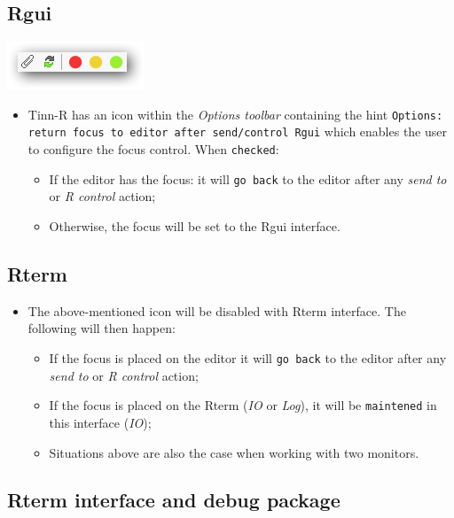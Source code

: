 \subsection{Rgui}

\includegraphics[scale=0.50]{./res/focus.png}

\begin{itemize}
  \item Tinn-R has an icon within the \textit{Options toolbar}
    containing the hint \texttt{Options: return focus to editor
      after send/control Rgui} which enables the user to configure
    the focus control. When \texttt{checked}:
    \begin{itemize}
      \item If the editor has the focus: it will \texttt{go back}
        to the editor after any \textit{send to} or \textit{R control}
        action;
      \item Otherwise, the focus will be set to the Rgui interface.
    \end{itemize}
\end{itemize}


\subsection{Rterm}

\begin{itemize}
  \item The above-mentioned icon will be disabled with Rterm interface.
    The following will then happen:
    \begin{itemize}
      \item If the focus is placed on the editor it will \texttt{go back}
        to the editor after any \textit{send to} or \textit{R control} action;
      \item If the focus is placed on the Rterm (\textit{IO} or \textit{Log}),
        it will be \texttt{maintened} in this interface (\textit{IO});
      \item Situations above are also the case when working with two monitors.
    \end{itemize}
\end{itemize}


\newpage
\subsection{Rterm interface and debug package}

